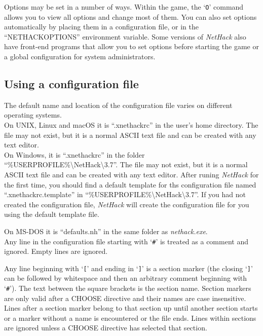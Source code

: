Options may be set in a number of ways.  Within the game, the `{\tt O}'
command allows you to view all options and change most of them.
You can also set options automatically by placing them in a configuration
file, or in the ``NETHACKOPTIONS'' environment variable.
Some versions of {\it NetHack\/} also have front-end programs that allow
you to set options before starting the game or a global configuration
for system administrators.

\subsection*{Using a configuration file}

The default name and location of the configuration file varies on different
operating systems.\\

On UNIX, Linux and macOS it is \mbox{``.xnethackrc''} in the user's home
directory. The file may not exist, but it is a normal ASCII text file and
can be created with any text editor.\\

On Windows, it is \mbox{``.xnethackrc''} in the folder
\mbox{{``\%USERPROFILE\%\textbackslash NetHack\textbackslash 3.7''}}. The
file may not exist, but it is a normal ASCII text file and can be created
with any text editor.
After runing {\it NetHack\/} for the first time, you should find a default
template for ths configuration file named \mbox{``.xnethackrc.template''} in
\mbox{{``\%USERPROFILE\%\textbackslash NetHack\textbackslash 3.7''}}.
If you had not created the configuration file, {\it NetHack\/} will create
the configuration file for you using the default template file.

On MS-DOS it is \mbox{``defaults.nh''} in the same folder as
\mbox{{\it nethack.exe\/}}.\\

Any line in the configuration file starting with `{\tt \#}' is treated
as a comment and ignored.
Empty lines are ignored.

Any line beginning with `{\tt [}' and ending in `{\tt ]}'
is a section marker (the closing `{\tt ]}' can be followed
by whitespace and then an arbitrary comment beginning with `{\tt \#}').
The text between the square brackets is the section name.
Section markers are only valid after a CHOOSE directive and their names
are case insensitive.
Lines after a section marker belong to that section up until another
section starts or a marker without a name is encountered or the file ends.
Lines within sections are ignored unless a CHOOSE directive has selected
that section.

